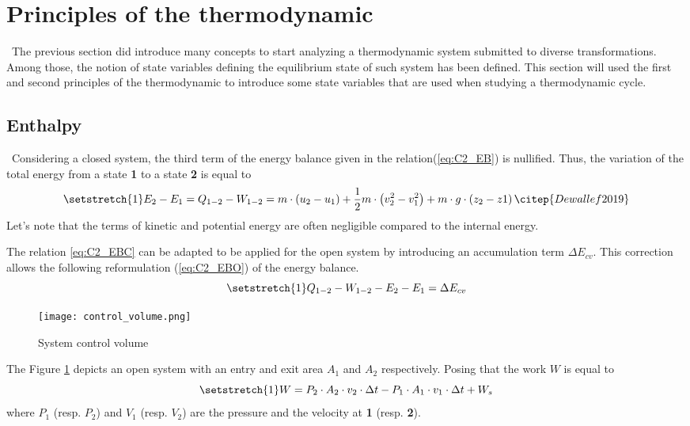 \section{Principles of the thermodynamic}
\quad\, The previous section did introduce many concepts to start analyzing a thermodynamic system submitted to diverse transformations. Among those, the notion of state variables defining the equilibrium state of such system has been defined. This section will used the first and second principles of the thermodynamic to introduce some state variables that are used when studying a thermodynamic cycle.

\subsection{Enthalpy}
\quad\, Considering a closed system, the third term of the energy balance given in the relation(\ref{eq:C2_EB}) is nullified. Thus, the variation of the total energy from a state \textbf{1} to a state \textbf{2} is equal to
\begin{equation}
\setstretch{1}
E_{2} - E_{1} = Q_{1-2} - W_{1-2} = m\cdot\left(u_2 - u_1\right) + \frac{1}{2}m\cdot\left(v^2_2 - v^2_1\right) + m\cdot g\cdot\left(z_2 - z1\right)\citep{Dewallef2019} \label{eq:C2_EBC}
\end{equation}
Let's note that the terms of kinetic and potential energy are often negligible compared to the internal energy.  

The relation \ref{eq:C2_EBC} can be adapted to be applied for the open system by introducing an accumulation term $\Delta E_{cv}$. This correction allows the following reformulation (\ref{eq:C2_EBO}) of the energy balance.
\begin{equation}
\setstretch{1}
Q_{1-2} - W_{1-2} - E_{2} - E_{1} = \Delta E_{cv}\label{eq:C2_EBO}
\end{equation}

\begin{figure}[h]
\centering
\texttt{[image: control\_volume.png]}
\caption{System control volume \cite{Dewallef2019}}
\label{fig:C2_VC}
\end{figure}

The Figure \ref{fig:C2_VC} depicts an open system with an entry and exit area $A_1$ and $A_2$ respectively. Posing that the work $W$ is equal to 
\begin{equation}
\setstretch{1}
W = P_2\cdot A_2\cdot v_2\cdot \Delta t - P_1\cdot A_1\cdot v_1\cdot \Delta t + W_s
\end{equation}      
where $P_1$ (resp. $P_2$) and $V_1$ (resp. $V_2$) are the pressure and the velocity at \textbf{1} (resp. \textbf{2}).

